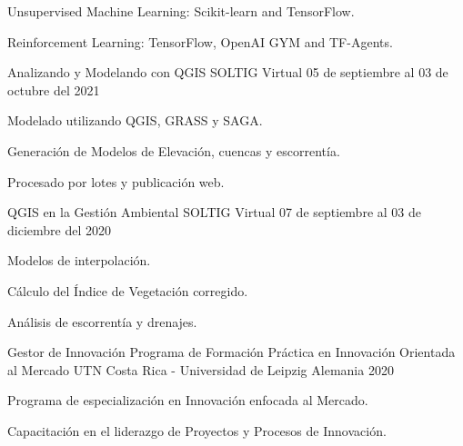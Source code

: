 \begin{cventries}
{\begin{cvitems}
        \item Unsupervised Machine Learning: Scikit-learn and TensorFlow.
        \item Reinforcement Learning: TensorFlow, OpenAI GYM and TF-Agents.
      \end{cvitems}
    }
  \cventry
  {Analizando y Modelando con QGIS} %
    {SOLTIG} %
    {Virtual} %
    {05 de septiembre al 03 de octubre del 2021} %
    {
      \begin{cvitems} %
        \item Modelado utilizando QGIS, GRASS y SAGA.
        \item Generación de Modelos de Elevación, cuencas y escorrentía.
        \item Procesado por lotes y publicación web.
      \end{cvitems}
    }
  \cventry
  {QGIS en la Gestión Ambiental} %
    {SOLTIG} %
    {Virtual} %
    {07 de septiembre al 03 de diciembre del 2020} %
    {
      \begin{cvitems} %
        \item Modelos de interpolación.
        \item Cálculo del Índice de Vegetación corregido.
        \item Análisis de escorrentía y drenajes.
      \end{cvitems}
    }
  \cventry
  {Gestor de Innovación} %
    {Programa de Formación Práctica en Innovación Orientada al
    Mercado} %
    {UTN Costa Rica - Universidad de Leipzig Alemania} %
    {2020} %
    {
      \begin{cvitems} %
        \item Programa de especialización en Innovación enfocada al
        Mercado.
        \item Capacitación en el liderazgo de Proyectos y Procesos de
        Innovación.
      \end{cvitems}
    }

\end{cventries}
